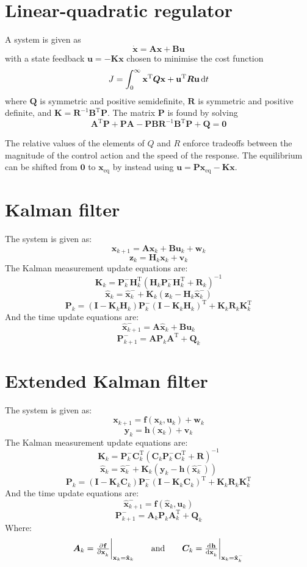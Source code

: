 \documentclass[a4paper]{article}
\newcommand{\M}[1]{\bm{#1}}
\newcommand{\Mc}[1]{\mathbf{#1}}
\newcommand{\V}[1]{\mathbf{#1}}
\newcommand{\transpose}{^{\text{T}}}
\newcommand{\sub}[1]{_{\mathrm{#1}}}
\begin{document}
\section{Linear-quadratic regulator}
A system is given as $$\V{\dot{x}} = \M{A}\V{x} + \M{B}\V{u}$$
with a state feedback $\V{u} = - \M{K}\V{x}$ chosen to minimise the cost function
$$J = \int_0^\infty \V{x}\transpose \M{Q} \V{x} + \V{u}\transpose \M{R} \V{u} \dif t$$
where $\M{Q}$ is symmetric and positive semidefinite, $\M{R}$ is symmetric and positive definite, and $\M{K} = \M{R}^{-1}\M{B}\transpose\M{P}$. The matrix $\M{P}$ is found by solving $$\M{A}\transpose \M{P} + \M{PA} - \M{PBR}^{-1}\M{B}\transpose \M{P} + \M{Q} = \M{0}$$

The relative values of the elements of $Q$ and $R$ enforce tradeoffs between the magnitude of the control action and the speed of the response. The equilibrium can be shifted from $\V{0}$ to $\V{x}\sub{eq}$ by instead using $\V{u} = \M{P}\V{x}\sub{eq} - \M{K}\V{x}$.



\section{Kalman filter}
The system is given as:
$$\V{x}_{k+1} = \M{A}\V{x}_k + \M{B}\V{u}_k + \V{w}_k$$
$$\V{z}_k = \M{H}_k\V{x}_k + \V{v}_k$$
The Kalman measurement update equations are:
$$\M{K}_k = \M{P}_k^- \M{H}_k\transpose (\M{H}_k\M{P}_k^- \M{H}_k\transpose + \M{R}_k)^{-1}$$
$$\V{\hat{x}}_k = \V{\hat{x}}_k^- + \M{K}_k(\V{z}_k - \M{H}_k \V{\hat{x}}_k^-)$$
$$\M{P}_k = (\Mc{I} - \M{K}_k \M{H}_k) \M{P}_k^- (\Mc{I}-\M{K}_k\M{H}_k)\transpose + \M{K}_k\M{R}_k\M{K}_k\transpose$$
And the time update equations are:
$$\V{\hat{x}}_{k+1}^- = \M{A}\V{\hat{x}}_k + \M{B}\V{u}_k$$
$$\M{P}_{k+1}^- = \M{AP}_k\M{A}\transpose + \M{Q}_k$$



\section{Extended Kalman filter}
The system is given as:
$$\V{x}_{k+1} = \V{f}(\V{x}_k, \V{u}_k) + \V{w}_k$$
$$\V{y}_k = \V{h}(\V{x}_k) + \V{v}_k$$
The Kalman measurement update equations are:
$$\M{K}_k = \M{P}_k^- \M{C}_k\transpose (\M{C}_k \M{P}_k^- \M{C}_k\transpose + \M{R})^{-1}$$
$$\V{\hat{x}}_k = \V{\hat{x}}_k^- + \M{K}_k \left(\V{y}_k - \V{h}(\V{\hat{x}}_k^-)\right)$$
$$\M{P}_k = (\Mc{I} - \M{K}_k\M{C}_k) \M{P}_k^- (\Mc{I} - \M{K}_k\M{C}_k)\transpose + \M{K}_k\M{R}_k\M{K}_k\transpose$$
And the time update equations are:
$$\V{\hat{x}}_{k+1}^- = \V{f}(\V{\hat{x}}_k, \V{u}_k)$$
$$\M{P}_{k+1}^- = \M{A}_k\M{P}_k\M{A}_k\transpose + \M{Q}_k$$
Where:
$$\M{A}_k = \pd{\V{f}}{\V{x}_k}\bigg|_{\V{x}_k = \V{\hat{x}}_k} \qquad\text{and}\qquad \M{C}_k = \od{\V{h}}{\V{x}_k}\bigg|_{\V{x}_k = \V{\hat{x}}_k^-}$$
\end{document}
